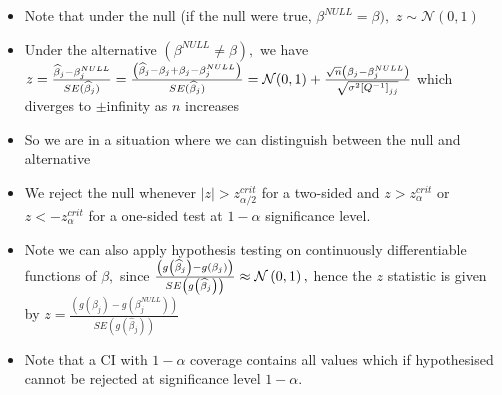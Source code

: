 \documentclass[notes=show]{beamer}
\begin{document}
\begin{frame}%


\begin{itemize}
\item Note that under the null (if the null were true, $\beta ^{NULL}=\beta
),$ $z\sim \mathcal{N}(0,1)$

\item Under the alternative $(\beta ^{NULL}\neq \beta ),$ we have $z=\frac{%
\widehat{\beta }_{j}-\beta _{j}^{NULL}}{SE(\widehat{\beta }_{j})}=\frac{%
\left( \widehat{\beta }_{j}-\beta _{j}+\beta _{j}-\beta _{j}^{NULL}\right) }{%
SE(\widehat{\beta }_{j})}=\mathcal{N}(0,1)+\frac{\sqrt{n}\left( \beta
_{j}-\beta _{j}^{NULL}\right) }{\sqrt{\sigma ^{2}\left[ Q^{-1}\right] _{jj}}}
$ which diverges to $\pm $infinity as $n$ increases

\item So we are in a situation where we can distinguish between the null and
alternative

\item We reject the null whenever $\left\vert z\right\vert >z_{\alpha
/2}^{crit}$ for a two-sided and $z>z_{\alpha }^{crit}$ or $z<-z_{\alpha
}^{crit}$ for a one-sided test at $1-\alpha $ significance level.
\end{itemize}

\end{frame}%

\begin{frame}%


\begin{itemize}
\item Note we can also apply hypothesis testing on continuously
differentiable functions of $\beta ,$ since $\frac{\left( g\left( \widehat{%
\beta }_{j}\right) -g\left( \beta _{j}\right) \right) }{SE\left( g\left( 
\widehat{\beta }_{j}\right) \right) }\approx \mathcal{N}\left( 0,1\right) ,$
hence the $z$ statistic is given by $z=\frac{\left( g\left( \widehat{\beta }%
_{j}\right) -g\left( \beta _{j}^{NULL}\right) \right) }{SE\left( g\left( 
\widehat{\beta }_{j}\right) \right) }$

\item Note that a CI with $1-\alpha $ coverage contains all values which if
hypothesised cannot be rejected at significance level $1-\alpha .$
\end{itemize}

\end{frame}%
\end{document}
